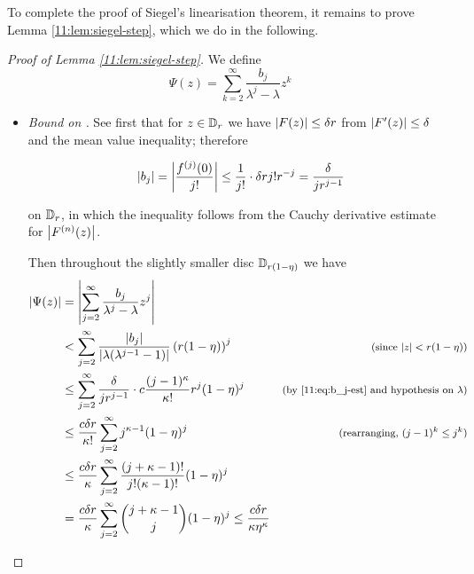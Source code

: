 \documentclass[../main.tex]{subfiles}
\begin{document}
To complete the proof of Siegel's linearisation theorem, it remains to prove Lemma \ref{11:lem:siegel-step}, which we do in the following.

\begin{proof}[Proof of Lemma \ref{11:lem:siegel-step}]

We define
\[
\Psi(z) = \sum_{k=2}^\infty \frac{b_j}{\lambda^j - \lambda}z^k
\]

\begin{itemize}
    \item \emph{Bound on \abs{\Psi}.} See first that for $z \in \mathbb{D}_r$ we have $\left|F(z)\right| \le \delta r$ from $\left|F'(z)\right| \le \delta$ and the mean value inequality; therefore
    
    \begin{equation}\label{11:eq:b_j-est}
    \left|b_j\right| =
    \left|\frac{f^{(j)}(0)}{j!}\right|
    \le \frac{1}{j!} \cdot \delta r j! r^{-j}
    = \frac{\delta}{j r^{j-1}}
    \end{equation}
    
    on $\mathbb{D}_r$, in which the inequality follows from the Cauchy derivative estimate for $\left|F^{(n)}(z)\right|$.

    Then throughout the slightly smaller disc $\mathbb{D}_{r(1-\eta)}$ we have
     \begin{align*}
        \left|\Psi(z)\right|
        &= \left|\sum_{j=2}^\infty
        \frac{b_j}{\lambda^j - \lambda}z^j
        \right|\\
        &<
        \sum_{j=2}^\infty
        \frac{\left|b_j\right|}{\left|\lambda(\lambda^{j-1} - 1)\right|}
        \left(r (1-\eta)\right)^j
        &\text{\footnotesize{(since $\left|z\right| < r(1-\eta)$)}}
        \\
        & \le
        \sum_{j=2}^\infty
        \frac{\delta}{jr^{j-1}} \cdot
        c \frac{(j-1)^\kappa}{\kappa!}
        r^j ( 1-\eta)^j
        & \text{\footnotesize{(by \eqref{11:eq:b_j-est} and hypothesis on $\lambda$)}}\\
        & \le
        \frac{c\delta r}{\kappa!}
        \sum_{j=2}^\infty
        j^{\kappa-1}
        ( 1-\eta)^j
        &\text{\footnotesize{(rearranging, $(j-1)^k \le j^k$)}}\\
        &\le
        \frac{c\delta r}{\kappa}
        \sum_{j=2}^\infty
        \frac{(j+\kappa-1)!}{j!(\kappa-1)!}
        (1-\eta)^j\\
        &=
        \frac{c\delta r}{\kappa}
        \sum_{j=2}^\infty
        {{j + \kappa - 1} \choose j}
        (1-\eta)^j
        \le \frac{c\delta r}{\kappa \eta^\kappa}
    \end{align*}
    

\end{itemize}
\end{proof}
\end{document}
